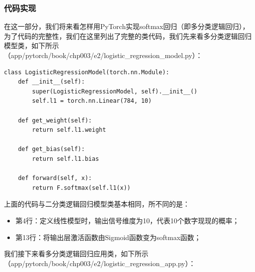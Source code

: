 \documentclass[UTF8]{article}
\begin{document}
\subsubsection{代码实现}
在这一部分，我们将来看怎样用PyTorch实现softmax回归（即多分类逻辑回归），为了代码的完整性，我们在这里列出了完整的类代码，我们先来看多分类逻辑回归模型类，如下所示（app/pytorch/book/chp003/e2/logistic\_regression\_model.py）：
\begin{lstlisting}
class LogisticRegressionModel(torch.nn.Module):
    def __init__(self):
        super(LogisticRegressionModel, self).__init__()
        self.l1 = torch.nn.Linear(784, 10)

    def get_weight(self):
        return self.l1.weight

    def get_bias(self):
        return self.l1.bias

    def forward(self, x):
        return F.softmax(self.l1(x))
\end{lstlisting}
上面的代码与二分类逻辑回归模型类基本相同，所不同的是：
\begin{itemize}
\item 第4行：定义线性模型时，输出信号维度为10，代表10个数字现现的概率；
\item 第13行：将输出层激活函数由Sigmoid函数变为softmax函数；
\end{itemize}
我们接下来看多分类逻辑回归应用类，如下所示（app/pytorch/book/chp003/e2/logistic\_regression\_app.py）：
\end{document}
